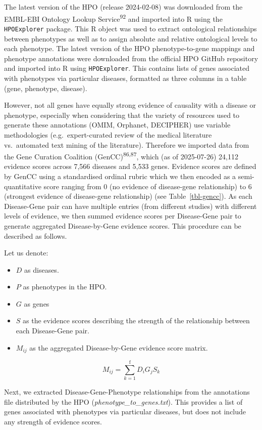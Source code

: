 \documentclass[
]{article}
\begin{document}
The latest version of the HPO (release 2024-02-08) was downloaded from
the EMBL-EBI Ontology Lookup Service\textsuperscript{92} and imported
into R using the \texttt{HPOExplorer} package. This R object was used to
extract ontological relationships between phenotypes as well as to
assign absolute and relative ontological levels to each phenotype. The
latest version of the HPO phenotype-to-gene mappings and phenotype
annotations were downloaded from the official HPO GitHub repository and
imported into R using \texttt{HPOExplorer}. This contains lists of genes
associated with phenotypes via particular diseases, formatted as three
columns in a table (gene, phenotype, disease).

However, not all genes have equally strong evidence of causality with a
disease or phenotype, especially when considering that the variety of
resources used to generate these annotations (OMIM, Orphanet, DECIPHER)
use variable methodologies (e.g.~expert-curated review of the medical
literature vs.~automated text mining of the literature). Therefore we
imported data from the Gene Curation Coalition
(GenCC)\textsuperscript{86,87}, which (as of 2025-07-26) 24,112 evidence
scores across 7,566 diseases and 5,533 genes. Evidence scores are
defined by GenCC using a standardised ordinal rubric which we then
encoded as a semi-quantitative score ranging from 0 (no evidence of
disease-gene relationship) to 6 (strongest evidence of disease-gene
relationship) (see Table~\ref{tbl-gencc}). As each Disease-Gene pair can
have multiple entries (from different studies) with different levels of
evidence, we then summed evidence scores per Disease-Gene pair to
generate aggregated Disease-by-Gene evidence scores. This procedure can
be described as follows.

Let us denote:

\begin{itemize}
\item
  \(D\) as diseases.
\item
  \(P\) as phenotypes in the HPO.
\item
  \(G\) as genes
\item
  \(S\) as the evidence scores describing the strength of the
  relationship between each Disease-Gene pair.
\item
  \(M_{ij}\) as the aggregated Disease-by-Gene evidence score matrix.
\end{itemize}

\[
M_{ij} = \sum_{k=1}^{\text{f}} D_i G_j S_k
\]

Next, we extracted Disease-Gene-Phenotype relationships from the
annotations file distributed by the HPO
(\emph{phenotype\_to\_genes.txt}). This provides a list of genes
associated with phenotypes via particular diseases, but does not include
any strength of evidence scores.
\end{document}

